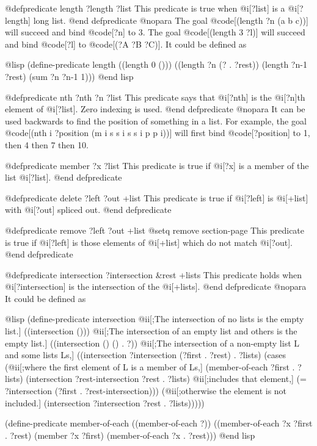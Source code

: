 {@defpredicate length ?length ?list
This predicate is true when @i[?list] is a @i[?length] long list.
@end defpredicate
@nopara
The goal @code[(length ?n (a b c))] will succeed and bind @code[?n] to
3.
The goal @code[(length 3 ?l)] will succeed and bind @code[?l] to
@code[(?A ?B ?C)].
It could be defined as

@lisp
(define-predicate length
  ((length 0 ()))
  ((length ?n (? . ?rest))
   (length ?n-1 ?rest)
   (sum ?n ?n-1 1)))
@end lisp

@defpredicate nth ?nth ?n ?list
This predicate says that @i[?nth] is the @i[?n]th element of
@i[?list].  Zero indexing is used.
@end defpredicate
@nopara
It can be used backwards to find the position of something in a list.
For example, the goal @code[(nth i ?position (m i s s i s s i p p i))]
will first bind @code[?position] to 1, then 4 then 7 then 10.

@defpredicate member ?x ?list
This predicate is true if @i[?x] is a member of the list @i[?list].
@end defpredicate

@defpredicate delete ?left ?out +list
This predicate is true if @i[?left] is @i[+list] with @i[?out] spliced 
out.
@end defpredicate

@defpredicate remove ?left ?out +list
@setq remove section-page
This predicate is true if @i[?left] is those elements of @i[+list] 
which do not match @i[?out].
@end defpredicate

@defpredicate intersection ?intersection &rest +lists
This predicate holds when @i[?intersection] is the intersection of
the @i[+lists].
@end defpredicate
@nopara
It could be defined as

@lisp
(define-predicate intersection
  @ii[;The intersection of no lists is the empty list.]
  ((intersection ()))
  @ii[;The intersection of an empty list and others is the empty list.]
  ((intersection () () . ?))
  @ii[;The intersection of a non-empty list L and some lists Ls,]
  ((intersection ?intersection (?first . ?rest) . ?lists)
   (cases (@ii[;where the first element of L is a member of Ls,]
           (member-of-each ?first . ?lists)           
           (intersection ?rest-intersection ?rest . ?lists)
           @ii[;includes that element,]
           (= ?intersection (?first . ?rest-intersection)))
          (@ii[;otherwise the element is not included.]
           (intersection ?intersection ?rest . ?lists)))))

(define-predicate member-of-each
  ((member-of-each ?))
  ((member-of-each ?x ?first . ?rest)
   (member ?x ?first)
   (member-of-each ?x . ?rest)))
@end lisp

}
